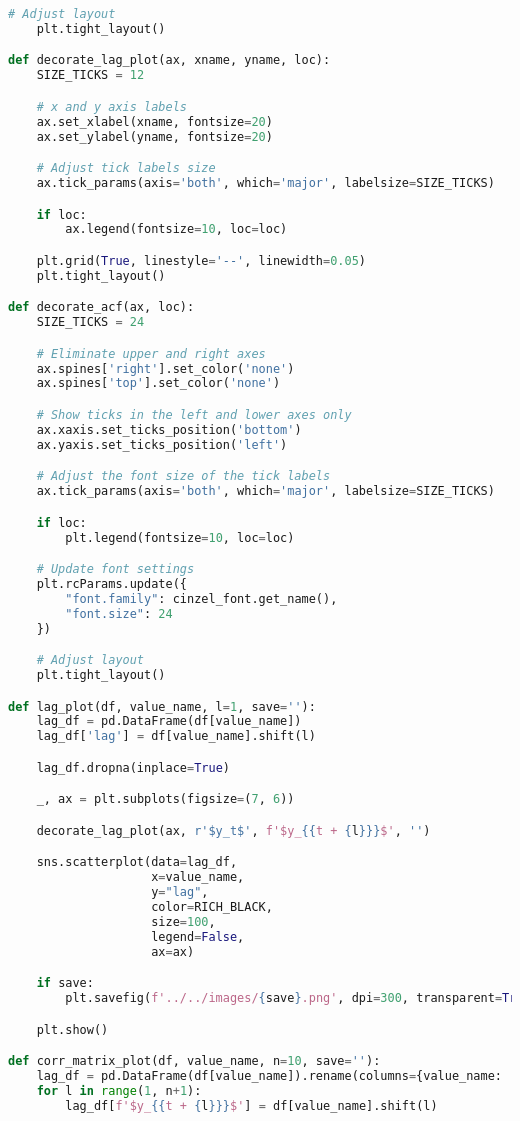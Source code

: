 \begin{center}
\begin{lstlisting}[language=Python]
    # Adjust layout
    plt.tight_layout()

def decorate_lag_plot(ax, xname, yname, loc):
    SIZE_TICKS = 12

    # x and y axis labels
    ax.set_xlabel(xname, fontsize=20)
    ax.set_ylabel(yname, fontsize=20)

    # Adjust tick labels size
    ax.tick_params(axis='both', which='major', labelsize=SIZE_TICKS)

    if loc:
        ax.legend(fontsize=10, loc=loc)

    plt.grid(True, linestyle='--', linewidth=0.05)
    plt.tight_layout()

def decorate_acf(ax, loc):
    SIZE_TICKS = 24

    # Eliminate upper and right axes
    ax.spines['right'].set_color('none')
    ax.spines['top'].set_color('none')

    # Show ticks in the left and lower axes only
    ax.xaxis.set_ticks_position('bottom')
    ax.yaxis.set_ticks_position('left')

    # Adjust the font size of the tick labels
    ax.tick_params(axis='both', which='major', labelsize=SIZE_TICKS)

    if loc:
        plt.legend(fontsize=10, loc=loc)

    # Update font settings
    plt.rcParams.update({
        "font.family": cinzel_font.get_name(), 
        "font.size": 24
    })

    # Adjust layout
    plt.tight_layout()

def lag_plot(df, value_name, l=1, save=''):
    lag_df = pd.DataFrame(df[value_name])
    lag_df['lag'] = df[value_name].shift(l)

    lag_df.dropna(inplace=True)

    _, ax = plt.subplots(figsize=(7, 6))

    decorate_lag_plot(ax, r'$y_t$', f'$y_{{t + {l}}}$', '')

    sns.scatterplot(data=lag_df, 
                    x=value_name,
                    y="lag", 
                    color=RICH_BLACK, 
                    size=100, 
                    legend=False, 
                    ax=ax)

    if save:
        plt.savefig(f'../../images/{save}.png', dpi=300, transparent=True)

    plt.show()

def corr_matrix_plot(df, value_name, n=10, save=''):
    lag_df = pd.DataFrame(df[value_name]).rename(columns={value_name: '$y_t$'})
    for l in range(1, n+1):
        lag_df[f'$y_{{t + {l}}}$'] = df[value_name].shift(l)


\end{lstlisting}
\end{center}
